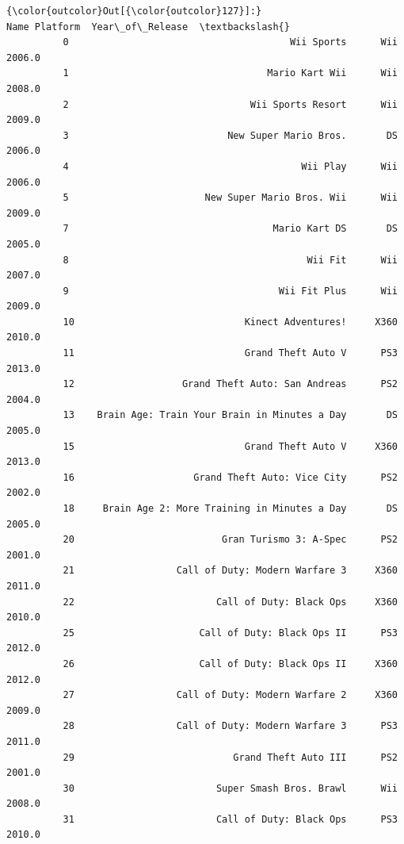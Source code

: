 \documentclass[11pt]{article}
\begin{document}
\begin{Verbatim}[commandchars=\\\{\}]
{\color{outcolor}Out[{\color{outcolor}127}]:}                                               Name Platform  Year\_of\_Release  \textbackslash{}
          0                                       Wii Sports      Wii           2006.0   
          1                                   Mario Kart Wii      Wii           2008.0   
          2                                Wii Sports Resort      Wii           2009.0   
          3                            New Super Mario Bros.       DS           2006.0   
          4                                         Wii Play      Wii           2006.0   
          5                        New Super Mario Bros. Wii      Wii           2009.0   
          7                                    Mario Kart DS       DS           2005.0   
          8                                          Wii Fit      Wii           2007.0   
          9                                     Wii Fit Plus      Wii           2009.0   
          10                              Kinect Adventures!     X360           2010.0   
          11                              Grand Theft Auto V      PS3           2013.0   
          12                   Grand Theft Auto: San Andreas      PS2           2004.0   
          13    Brain Age: Train Your Brain in Minutes a Day       DS           2005.0   
          15                              Grand Theft Auto V     X360           2013.0   
          16                     Grand Theft Auto: Vice City      PS2           2002.0   
          18     Brain Age 2: More Training in Minutes a Day       DS           2005.0   
          20                          Gran Turismo 3: A-Spec      PS2           2001.0   
          21                  Call of Duty: Modern Warfare 3     X360           2011.0   
          22                         Call of Duty: Black Ops     X360           2010.0   
          25                      Call of Duty: Black Ops II      PS3           2012.0   
          26                      Call of Duty: Black Ops II     X360           2012.0   
          27                  Call of Duty: Modern Warfare 2     X360           2009.0   
          28                  Call of Duty: Modern Warfare 3      PS3           2011.0   
          29                            Grand Theft Auto III      PS2           2001.0   
          30                         Super Smash Bros. Brawl      Wii           2008.0   
          31                         Call of Duty: Black Ops      PS3           2010.0   

\end{Verbatim}
\end{document}
